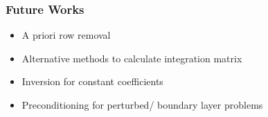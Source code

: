 \documentclass{beamer}
\begin{document}
\begin{frame}
\frametitle{Future Works}
\begin{itemize}
\item A priori row removal
\item Alternative methods to calculate integration matrix
\item Inversion for constant coefficients
\item Preconditioning for perturbed/ boundary layer problems
\end{itemize}
\end{frame}
\end{document}

